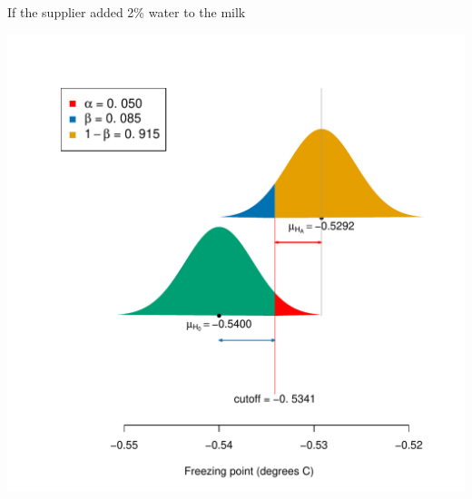 \documentclass[10pt,handout]{beamer}\usepackage[]{graphicx}\usepackage[]{color}
\makeatletter
\def\maxwidth{ %
  \ifdim\Gin@nat@width>\linewidth
    \linewidth
  \else
    \Gin@nat@width
  \fi
}
\newenvironment{knitrout}{}{} %
\makeatother
\begin{document}
\begin{frame}[fragile]{If the supplier added 2\% water to the milk}
\begin{knitrout}\tiny
{}\color{fgcolor}

{\centering \includegraphics[width=\maxwidth]{figure/unnamed-chunk-9-1} 

}


\end{knitrout}
\end{frame}
\end{document}
